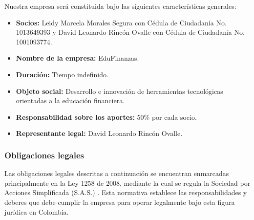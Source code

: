 Nuestra empresa será constituida bajo las siguientes características generales:

\begin{itemize}
	\item \textbf{Socios:} Leidy Marcela Morales Segura con Cédula de Ciudadanía No. 1013649393 y David Leonardo Rincón Ovalle con Cédula de Ciudadanía No. 1001093774.
	
	\item \textbf{Nombre de la empresa:} EduFinanzas.
	
	\item \textbf{Duración:} Tiempo indefinido.
	
	\item \textbf{Objeto social:} Desarrollo e innovación de herramientas tecnológicas orientadas a la educación financiera.
	
	\item \textbf{Responsabilidad sobre los aportes:} 50\% por cada socio.
	
	\item \textbf{Representante legal:} David Leonardo Rincón Ovalle.  
\end{itemize}

\subsubsection*{Obligaciones legales}

Las obligaciones legales descritas a continuación se encuentran enmarcadas principalmente en la Ley 1258 de 2008, mediante la cual se regula la Sociedad por Acciones Simplificada (S.A.S.) \parencite{Ley1258}. Esta normativa establece las responsabilidades y deberes que debe cumplir la empresa para operar legalmente bajo esta figura jurídica en Colombia.


